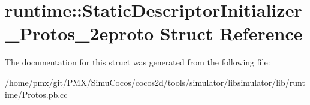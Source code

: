 \hypertarget{structruntime_1_1StaticDescriptorInitializer__Protos__2eproto}{}\section{runtime\+:\+:Static\+Descriptor\+Initializer\+\_\+\+Protos\+\_\+2eproto Struct Reference}
\label{structruntime_1_1StaticDescriptorInitializer__Protos__2eproto}


The documentation for this struct was generated from the following file\+:\begin{DoxyCompactItemize}
\item 
/home/pmx/git/\+P\+M\+X/\+Simu\+Cocos/cocos2d/tools/simulator/libsimulator/lib/runtime/Protos.\+pb.\+cc\end{DoxyCompactItemize}
